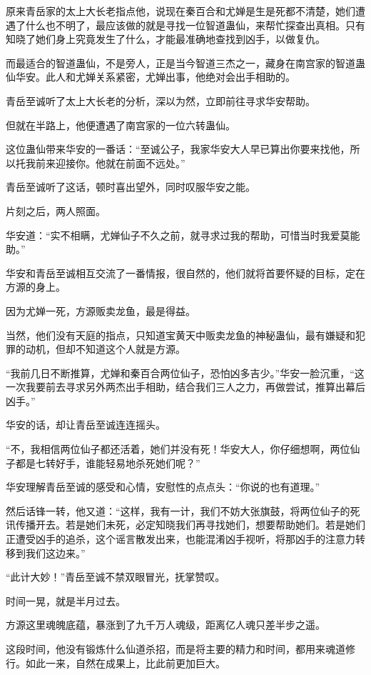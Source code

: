 \begin{this_body}
原来青岳家的太上大长老指点他，说现在秦百合和尤婵是生是死都不清楚，她们遭遇了什么也不明了，最应该做的就是寻找一位智道蛊仙，来帮忙探查出真相。只有知晓了她们身上究竟发生了什么，才能最准确地查找到凶手，以做复仇。

而最适合的智道蛊仙，不是旁人，正是当今智道三杰之一，藏身在南宫家的智道蛊仙华安。此人和尤婵关系紧密，尤婵出事，他绝对会出手相助的。

青岳至诚听了太上大长老的分析，深以为然，立即前往寻求华安帮助。

但就在半路上，他便遭遇了南宫家的一位六转蛊仙。

这位蛊仙带来华安的一番话：“至诚公子，我家华安大人早已算出你要来找他，所以托我前来迎接你。他就在前面不远处。”

青岳至诚听了这话，顿时喜出望外，同时叹服华安之能。

片刻之后，两人照面。

华安道：“实不相瞒，尤婵仙子不久之前，就寻求过我的帮助，可惜当时我爱莫能助。”

华安和青岳至诚相互交流了一番情报，很自然的，他们就将首要怀疑的目标，定在方源的身上。

因为尤婵一死，方源贩卖龙鱼，最是得益。

当然，他们没有天庭的指点，只知道宝黄天中贩卖龙鱼的神秘蛊仙，最有嫌疑和犯罪的动机，但却不知道这个人就是方源。

“我前几日不断推算，尤婵和秦百合两位仙子，恐怕凶多吉少。”华安一脸沉重，“这一次我要前去寻求另外两杰出手相助，结合我们三人之力，再做尝试，推算出幕后凶手。”

华安的话，却让青岳至诚连连摇头。

“不，我相信两位仙子都还活着，她们并没有死！华安大人，你仔细想啊，两位仙子都是七转好手，谁能轻易地杀死她们呢？”

华安理解青岳至诚的感受和心情，安慰性的点点头：“你说的也有道理。”

然后话锋一转，他又道：“这样，我有一计，我们不妨大张旗鼓，将两位仙子的死讯传播开去。若是她们未死，必定知晓我们再寻找她们，想要帮助她们。若是她们正遭受凶手的追杀，这个谣言散发出来，也能混淆凶手视听，将那凶手的注意力转移到我们这边来。”

“此计大妙！”青岳至诚不禁双眼冒光，抚掌赞叹。

时间一晃，就是半月过去。

方源这里魂魄底蕴，暴涨到了九千万人魂级，距离亿人魂只差半步之遥。

这段时间，他没有锻炼什么仙道杀招，而是将主要的精力和时间，都用来魂道修行。如此一来，自然在成果上，比此前更加巨大。


\end{this_body}
